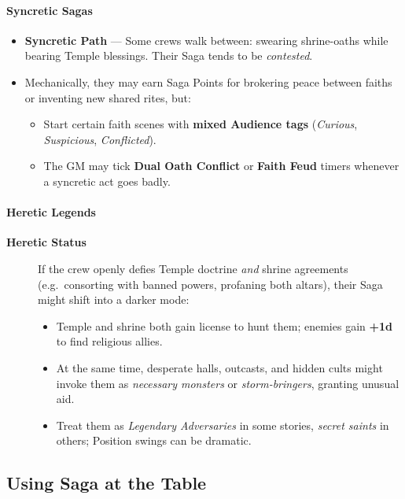 \documentclass[11pt]{article}
\begin{document}
\paragraph*{Syncretic Sagas}
\begin{itemize}
  \item \textbf{Syncretic Path} --- Some crews walk between: swearing shrine-oaths while bearing
        Temple blessings. Their Saga tends to be \emph{contested}.
  \item Mechanically, they may earn Saga Points for brokering peace between faiths or inventing
        new shared rites, but:
        \begin{itemize}
          \item Start certain faith scenes with \textbf{mixed Audience tags} (\emph{Curious},
                \emph{Suspicious}, \emph{Conflicted}).
          \item The GM may tick \textbf{Dual Oath Conflict} or \textbf{Faith Feud} timers whenever
                a syncretic act goes badly.
        \end{itemize}
\end{itemize}

\paragraph*{Heretic Legends}
\begin{description}
  \item[\textbf{Heretic Status}] If the crew openly defies Temple doctrine \emph{and} shrine
    agreements (e.g.\ consorting with banned powers, profaning both altars), their Saga might
    shift into a darker mode:
    \begin{itemize}
      \item Temple and shrine both gain license to hunt them; enemies gain \textbf{+1d} to find
            religious allies.
      \item At the same time, desperate halls, outcasts, and hidden cults might invoke them as
            \emph{necessary monsters} or \emph{storm-bringers}, granting unusual aid.
      \item Treat them as \emph{Legendary Adversaries} in some stories, \emph{secret saints} in
            others; Position swings can be dramatic.
    \end{itemize}
\end{description}

\subsection{Using Saga at the Table}
\end{document}
